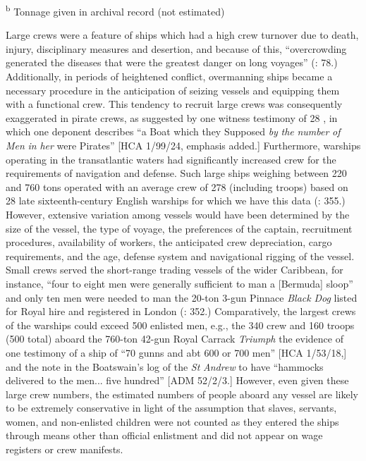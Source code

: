 \textsuperscript{b} Tonnage given in archival record (not estimated)

Large crews were a feature of ships which had a high crew turnover due to death, injury, disciplinary measures and desertion, and because of this, “overcrowding generated the diseases that were the greatest danger on long voyages” (\citealt{Bicheno2012}: 78.) Additionally, in periods of heightened conflict, overmanning ships became a necessary procedure in the anticipation of seizing vessels and equipping them with a functional crew. This tendency to recruit large crews was consequently exaggerated in pirate crews, as suggested by one witness testimony of 28 \citealt{March1722}, in which one deponent describes “a Boat which they Supposed \textit{by} \textit{the} \textit{number} \textit{of} \textit{Men} \textit{in} \textit{her} were Pirates” [HCA 1/99/24, emphasis added.] Furthermore, warships operating in the transatlantic waters had significantly increased crew for the requirements of navigation and defense. Such large ships weighing between 220 and 760 tons operated with an average crew of 278 (including troops) based on 28 late sixteenth-century English warships for which we have this data (\citealt{Bicheno2012}: 355.) However, extensive variation among vessels would have been determined by the size of the vessel, the type of voyage, the preferences of the captain, recruitment procedures, availability of workers, the anticipated crew depreciation, cargo requirements, and the age, defense system and navigational rigging of the vessel. Small crews served the short-range trading vessels of the wider Caribbean, for instance, “four to eight men were generally sufficient to man a [Bermuda] sloop” \citep[123]{Jarvis2010} and only ten men were needed to man the 20-ton 3-gun Pinnace \textit{Black} \textit{Dog} listed for Royal hire and registered in London (\citealt{Bicheno2012}: 352.) Comparatively, the largest crews of the warships could exceed 500 enlisted men, e.g., the 340 crew and 160 troops (500 total) aboard the 760-ton 42-gun Royal Carrack \textit{Triumph} \citep[355,]{Bicheno2012} the evidence of one testimony of a ship of “70 gunns and abt 600 or 700 men” [HCA 1/53/18,] and the note in the Boatswain’s log of the \textit{St} \textit{Andrew} to have “hammocks delivered to the men... five hundred” [ADM 52/2/3.] However, even given these large crew numbers, the estimated numbers of people aboard any vessel are likely to be extremely conservative in light of the assumption that slaves, servants, women, and non-enlisted children were not counted as they entered the ships through means other than official enlistment and did not appear on wage registers or crew manifests. 

